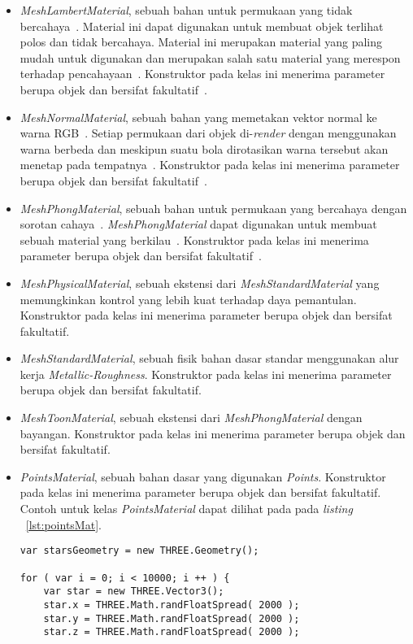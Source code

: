 \begin{itemize}
\begin{itemize}
		\item {\it MeshLambertMaterial}, sebuah bahan untuk permukaan yang tidak bercahaya~\cite{threejs}. Material ini dapat digunakan untuk membuat objek terlihat polos dan tidak bercahaya. Material ini merupakan material yang paling mudah untuk digunakan dan merupakan salah satu material yang merespon terhadap pencahayaan~\cite{learningThreejs}. Konstruktor pada kelas ini menerima parameter berupa objek dan bersifat fakultatif~\cite{threejs}.
		\item {\it MeshNormalMaterial}, sebuah bahan yang memetakan vektor normal ke warna RGB~\cite{threejs}. Setiap permukaan dari objek di-{\it render} dengan menggunakan warna berbeda dan meskipun suatu bola dirotasikan warna tersebut akan menetap pada tempatnya~\cite{learningThreejs}. Konstruktor pada kelas ini menerima parameter berupa objek dan bersifat fakultatif~\cite{threejs}.
		\item {\it MeshPhongMaterial}, sebuah bahan untuk permukaan yang bercahaya dengan sorotan cahaya~\cite{threejs}. {\it MeshPhongMaterial} dapat digunakan untuk membuat sebuah material yang berkilau~\cite{learningThreejs}. Konstruktor pada kelas ini menerima parameter berupa objek dan bersifat fakultatif~\cite{threejs}.
		\item {\it MeshPhysicalMaterial}, sebuah ekstensi dari {\it MeshStandardMaterial} yang memungkinkan kontrol yang lebih kuat terhadap daya pemantulan. Konstruktor pada kelas ini menerima parameter berupa objek dan bersifat fakultatif.
		\item {\it MeshStandardMaterial}, sebuah fisik bahan dasar standar menggunakan alur kerja {\it Metallic-Roughness}. Konstruktor pada kelas ini menerima parameter berupa objek dan bersifat fakultatif.
		\item {\it MeshToonMaterial}, sebuah ekstensi dari {\it MeshPhongMaterial} dengan bayangan. Konstruktor pada kelas ini menerima parameter berupa objek dan bersifat fakultatif.
		\item {\it PointsMaterial}, sebuah bahan dasar yang digunakan {\it Points}. Konstruktor pada kelas ini menerima parameter berupa objek dan bersifat fakultatif. Contoh untuk kelas {\it PointsMaterial} dapat dilihat pada pada {\it listing} ~\ref{lst:pointsMat}.
\begin{lstlisting}[caption={Contoh penggunaan kelas {\it PointsMaterial}.}, label={lst:pointsMat},captionpos=b]
var starsGeometry = new THREE.Geometry();

for ( var i = 0; i < 10000; i ++ ) {
	var star = new THREE.Vector3();
	star.x = THREE.Math.randFloatSpread( 2000 );
	star.y = THREE.Math.randFloatSpread( 2000 );
	star.z = THREE.Math.randFloatSpread( 2000 );


\end{lstlisting}
\end{itemize}
\end{itemize}
